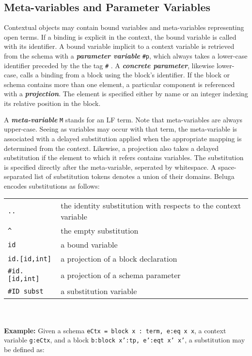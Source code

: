 \documentclass[11pt]{article}
\begin{document}
\subsection{Meta-variables and Parameter Variables}
Contextual objects may contain bound variables and meta-variables representing open terms. If a binding is explicit in the context, the bound variable is called with its identifier. A bound variable implicit to a context variable is retrieved from the schema with a \textit{\textbf{parameter variable}} \texttt{\#p}, which always takes a lower-case identifier preceded by the the tag \texttt{\#} . A \textit{\textbf{concrete parameter}}, likewise lower-case, calls a binding from a block using the block's identifier. If the block or schema contains more than one element, a particular component is referenced with a \textbf{\textit{projection}}. The element is specified either by name or an integer indexing its relative position in the block. 

A \textit{\textbf{meta-variable}} \texttt{M} stands for an LF term. Note that meta-variables are always upper-case. Seeing as variables may occur with that term, the meta-variable is associated with a delayed substitution applied when the appropriate mapping is determined from the context. Likewise, a projection also takes a delayed substitution if the element to which it refers contains variables. The substitution is specified directly after the meta-variable, seperated by whitespace. A space-separated list of substitution tokens denotes a union of their domains. Beluga encodes substitutions as follows: \\

\begin{tabular}{ | l l}
\texttt{..} & the identity substitution with respects to the context variable\\
\texttt{\^} & the empty substitution\\
\texttt{id} & a bound variable\\
\texttt{id.[id,int]} & a projection of a block declaration\\
\texttt{\#id.[id,int]} & a projection of a schema parameter\\
\texttt{\#ID subst} & a substitution variable\\
\end{tabular}\\
\\

\textbf{Example:} Given a schema \texttt{eCtx = block x : term, e:eq x x}, a context variable \texttt{g:eCtx}, and a block \texttt{b:block x':tp, e':eqt x' x'}, a substitution may be defined as:
\end{document}
